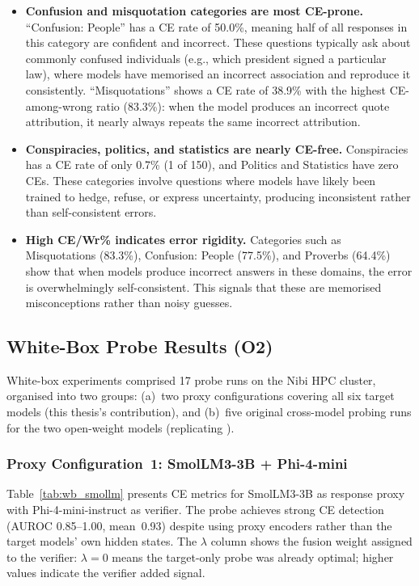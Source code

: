 \documentclass[12pt,twocolumn]{article}
\begin{document}
\begin{itemize}[nosep]
\item \textbf{Confusion and misquotation categories are most
      CE-prone.} ``Confusion: People'' has a CE rate of 50.0\%,
      meaning half of all responses in this category are confident
      and incorrect. These questions typically ask about commonly
      confused individuals (e.g., which president signed a particular
      law), where models have memorised an incorrect association and
      reproduce it consistently. ``Misquotations'' shows a CE rate of
      38.9\% with the highest CE-among-wrong ratio (83.3\%): when the
      model produces an incorrect quote attribution, it nearly always
      repeats the same incorrect attribution.
\item \textbf{Conspiracies, politics, and statistics are nearly
      CE-free.} Conspiracies has a CE rate of only 0.7\% (1 of 150),
      and Politics and Statistics have zero CEs. These categories
      involve questions where models have likely been trained to
      hedge, refuse, or express uncertainty, producing inconsistent
      rather than self-consistent errors.
\item \textbf{High CE/Wr\% indicates error rigidity.} Categories
      such as Misquotations (83.3\%), Confusion: People (77.5\%), and
      Proverbs (64.4\%) show that when models produce incorrect answers in these
      domains, the error is overwhelmingly self-consistent. This
      signals that these are memorised misconceptions rather than
      noisy guesses.
\end{itemize}

\subsection{White-Box Probe Results (O2)}
\label{sec:results-wb}

White-box experiments comprised 17 probe runs on the Nibi HPC
cluster, organised into two groups: (a)~two proxy configurations
covering all six target models (this thesis's contribution), and
(b)~five original cross-model probing runs for the two open-weight
models (replicating \citealp{tan2025consistent}).

\subsubsection{Proxy Configuration~1: SmolLM3-3B + Phi-4-mini}

Table~\ref{tab:wb_smollm} presents CE metrics for SmolLM3-3B as
response proxy with Phi-4-mini-instruct as verifier. The probe
achieves strong CE detection (AUROC 0.85--1.00, mean~0.93) despite
using proxy encoders rather than the target models' own hidden
states. The $\lambda$ column shows the fusion weight assigned to the
verifier: $\lambda = 0$ means the target-only probe was already
optimal; higher values indicate the verifier added signal.
\end{document}
